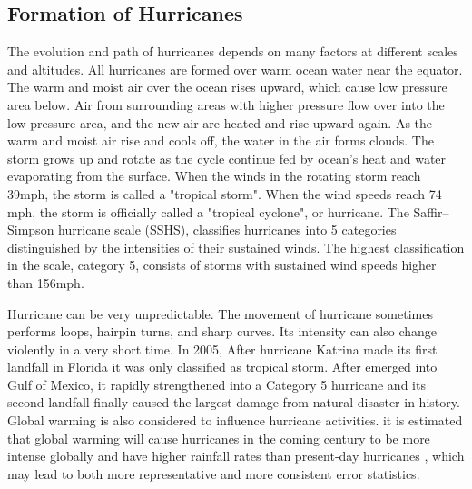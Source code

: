 \subsection{Formation of Hurricanes}
The evolution and path of hurricanes depends on many factors at different scales and altitudes. All hurricanes are formed over warm ocean water near the equator. The warm and moist air over the ocean rises upward, which cause low pressure area below. Air from surrounding areas with higher pressure flow over into the low pressure area, and the new air are heated and rise upward again. As the warm and moist air rise and cools off, the water in the air forms clouds. The storm grows up and rotate as the cycle continue fed by ocean's heat and water evaporating from the surface. When the winds in the rotating storm reach 39mph, the storm is called a "tropical storm". When the wind speeds reach 74 mph, the storm is officially called a "tropical cyclone", or hurricane. The Saffir–Simpson hurricane scale (SSHS), classifies hurricanes into 5 categories distinguished by the intensities of their sustained winds. The highest classification in the scale, category 5, consists of storms with sustained wind speeds higher than 156mph.

Hurricane can be very unpredictable. The movement of hurricane sometimes performs loops, hairpin turns, and sharp curves. Its intensity can also change violently in a very short time. In 2005, After hurricane Katrina made its first landfall in Florida it was only classified as tropical storm. After emerged into Gulf of Mexico, it rapidly strengthened into a Category 5 hurricane and its second landfall finally caused the largest damage from natural disaster in history. Global warming is also considered to influence hurricane activities. it is estimated that global warming will cause hurricanes in the coming century to be more intense globally and have higher rainfall rates than present-day hurricanes , which may lead to both more representative and more consistent error statistics.



